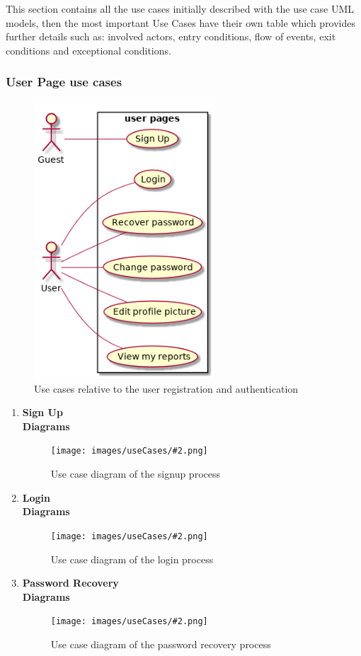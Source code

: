 \newcommand{\usecasefigure}[3][1.0]{
	\begin{figure}[htp]
		\centering
		\texttt{[image: images/useCases/\#2.png]}
		\caption{Use case diagram #3}
		\label{fig:use_cases_#2}
	\end{figure}
	\newpage
}

This section contains all the use cases initially described with the use case UML models, then the most important Use Cases have their own table which provides further details such as: involved actors, entry conditions, flow of events,  exit conditions and exceptional conditions.

\subsubsection{User Page use cases}
\begin{figure}[htp]
	\centering
	\includegraphics[width=0.6\textwidth]{images/useCases/uc_user_page.png}
	\caption{Use cases relative to the user registration and authentication} 
	\label{fig:userpage} 
\end{figure} 

\newpage
\begin{enumerate}
	\item \textbf{Sign Up}\\
		
		\newpage
		\textbf{Diagrams}
		\usecasefigure{sign_up}{of the signup process}
		\newpage
	\item \textbf{Login}\\
		
		\newpage
		\textbf{Diagrams}
		\usecasefigure{login}{of the login process}
		\newpage
	\item \textbf{Password Recovery}\\
		
		\newpage
		\textbf{Diagrams}
		\usecasefigure[0.95]{password_recovery}{of the password recovery process}
		\newpage
\end{enumerate}
\newpage


